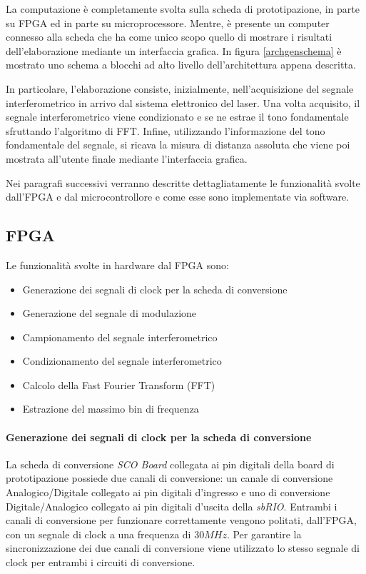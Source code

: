La computazione è completamente svolta sulla scheda di prototipazione, in parte su FPGA ed in parte su microprocessore. Mentre, è presente un computer connesso alla scheda che ha come unico scopo quello di mostrare i risultati dell'elaborazione mediante un interfaccia grafica. In figura \ref{archgenschema} è mostrato uno schema a blocchi ad alto livello dell'architettura appena descritta.

In particolare, l'elaborazione consiste, inizialmente, nell'acquisizione del segnale interferometrico in arrivo dal sistema elettronico del laser. Una volta acquisito, il segnale interferometrico viene condizionato e se ne estrae il tono fondamentale sfruttando l'algoritmo di FFT. Infine, utilizzando l'informazione del tono fondamentale del segnale, si ricava la misura di distanza assoluta che viene poi mostrata all'utente finale mediante l'interfaccia grafica.

Nei paragrafi successivi verranno descritte dettagliatamente le funzionalità svolte dall'FPGA e dal microcontrollore e come esse sono implementate via software.

\subsection{FPGA}
Le funzionalità svolte in hardware dal FPGA sono:
\begin{itemize}
	\item Generazione dei segnali di clock per la scheda di conversione
	\item Generazione del segnale di modulazione
	\item Campionamento del segnale interferometrico
	\item Condizionamento del segnale interferometrico
	\item Calcolo della Fast Fourier Transform (FFT)
	\item Estrazione del massimo bin di frequenza
\end{itemize}

\paragraph{Generazione dei segnali di clock per la scheda di conversione}
La scheda di conversione \textit{SCO Board} collegata ai pin digitali della board di prototipazione possiede due canali di conversione: un canale di conversione Analogico/Digitale collegato ai pin digitali d'ingresso e uno di conversione Digitale/Analogico collegato ai pin digitali d'uscita della \textit{sbRIO}. Entrambi i canali di conversione per funzionare correttamente vengono politati, dall'FPGA, con un segnale di clock a una frequenza di $30MHz$. Per garantire la sincronizzazione dei due canali di conversione viene utilizzato lo stesso segnale di clock per entrambi i circuiti di conversione.

